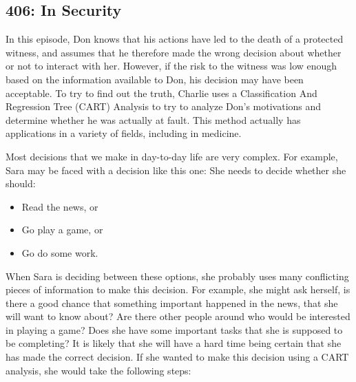 \newpage
\subsection{406: In Security}\label{406}

In this episode, Don knows that his actions have led to the death of a protected witness, and assumes that he therefore made the wrong decision about whether or not to interact with her. However, if the risk to the witness was low enough based on the information available to Don, his decision may have been acceptable. To try to find out the truth, Charlie uses a Classification And Regression Tree (CART) Analysis to try to analyze Don's motivations and determine whether he was actually at fault. This method actually has applications in a variety of fields, including in medicine. \\

 \vspace{0.2cm}

Most decisions that we make in day-to-day life are very complex. For example, Sara may be faced with a decision like this one: She needs to decide whether she should:
\begin{itemize}
\item Read the news, or
\item Go play a game, or
\item Go do some work.
\end{itemize}
When Sara is deciding between these options, she probably uses many conflicting pieces of information to make this decision. For example, she might ask herself, is there a good chance that something important happened in the news, that she will want to know about? Are there other people around who would be interested in playing a game? Does she have some important tasks that she is supposed to be completing? It is likely that she will have a hard time being certain that she has made the correct decision. If she wanted to make this decision using a CART analysis, she would take the following steps: \\

